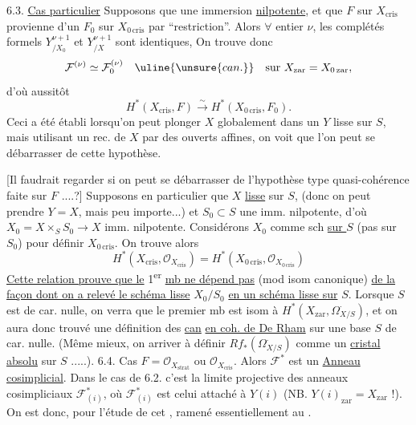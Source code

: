 6.3. \uline{Cas particulier} Supposons que  une immersion \uline{nilpotente},  et que $F$ sur $X_{\mathrm{cris}}$ provienne d'un $F_0$ sur $X_{0\,\mathrm{cris}}$ par ``restriction''. Alors $\forall$ entier $\nu$, les complétés formels $Y^{\nu+1}_{/X_0}$ et $Y^{\nu+1}_{/X}$ sont identiques, On trouve donc
\[
\mathcal F^{(\nu)}\simeq\mathcal F_0^{(\nu)}\quad\uline{\unsure{can.}}\quad\text{sur }X_{\mathrm{zar}}=X_{0\,\mathrm{zar}},
\]
d'où aussitôt
\[
H^*(X_{\mathrm{cris}},F)\xrightarrow{\sim}H^*(X_{0\,\mathrm{cris}},F_0).
\]
Ceci a été établi lorsqu'on peut plonger $X$ globalement dans un $Y$  lisse sur $S$, mais  utilisant un rec. de $X$ par des ouverts affines, on voit que l'on peut se débarrasser de cette hypothèse.

[Il faudrait regarder si on peut se débarrasser de l'hypothèse type quasi-cohérence faite sur $F$ ....?]
Supposons en particulier que $X$  \uline{lisse} sur $S$, (donc on peut prendre $Y=X$, mais peu importe...) et $S_0\subset S$ une imm. nilpotente, d'où $X_0=X\times_S S_0\longrightarrow X$ imm. nilpotente. Considérons $X_0$ comme sch \uline{sur $S$} (pas sur $S_0$) pour définir $X_{0\,\mathrm{cris}}$.
On trouve alors
\[
H^*(X_{\mathrm{cris}},\mathcal O_{X_{\mathrm{cris}}})=H^*(X_{0\,\mathrm{cris}},\mathcal O_{X_{0\,\mathrm{cris}}})
\]
\uline{Cette relation prouve que le} 1\textsuperscript{er} \uline{mb ne dépend pas} (mod isom canonique) \uline{de la façon dont on a relevé le schéma lisse} $X_0/S_0$ \uline{en un schéma lisse sur} $S$.
Lorsque $S$ est de car. nulle, on verra que le premier mb est isom à $H^*(X_{\mathrm{zar}},\Omega^{\boldsymbol\cdot}_{X/S})$, et on aura donc trouvé une définition des \uline{} \uline{can} \uline{en coh. de De Rham} sur une base $S$ de car. nulle.
(Même mieux, on   arriver à définir $Rf_*(\Omega^{\boldsymbol\cdot}_{X/S})$ comme un \uline{cristal absolu} sur $S$ .....).
6.4. Cas $F=\mathcal O_{X_{\mathrm{strat}}}$ ou $\mathcal O_{X_{\mathrm{cris}}}$. Alors $\mathcal F^*$ est un \uline{Anneau cosimplicial}. 
Dans le cas de 6.2. c'est la limite projective des anneaux cosimpliciaux $\mathcal F_{(i)}^*$, où $\mathcal F_{(i)}^*$ est celui attaché à $Y(i)$ (NB. $Y(i)_{\mathrm{zar}}=X_{\mathrm{zar}}$ !). On est donc, pour l'étude de cet , ramené essentiellement au  .

